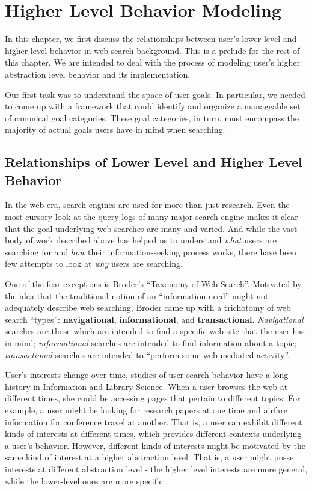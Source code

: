 \chapter{Higher Level Behavior Modeling}

In this chapter, we first discuss the relationships between user's lower level and higher level behavior in web search background. This is a prelude for the rest of this chapter. We are intended to deal with the process of modeling user's higher abstraction level behavior and its implementation. 

Our first task was to understand the space of user goals. In particular, we needed to come up with a framework that could identify and organize a manageable set of canonical goal categories. These goal categories, in turn, must encompass the majority of actual goals users have in mind when searching.

\section{Relationships of Lower Level and Higher Level Behavior}

In the web era, search engines are used for more than just research. Even the most cursory look at the query logs of many major search engine makes it clear that the goal underlying web searches are many and varied. And while the vast body of work described above has helped us to understand {\it what} users are searching for and {\it how} their information-seeking process works, there have been few attempts to look at {\it why} users are searching.

One of the fear exceptions is Broder's ``Taxonomy of Web Search''\cite{Broder2002}. Motivated by the idea that the traditional notion of an ``information need'' might not adequately describe web searching, Broder came up with a trichotomy of web search ``types'': {\bf navigational}, {\bf informational}, and {\bf transactional}. {\it Navigational} searches are those which are intended to find a specific web site that the user has in mind; {\it informational} searches are intended to find information about a topic; {\it transactional} searches are intended to ``perform some web-mediated activity''.

User's interests change over time, studies of user search behavior have a long history in Information and Library Science\cite{Bates1979}\cite{Rose}\cite{Spink2002}. When a user browses the web at different times, she could be accessing pages that pertain to different topics. For example, a user might be looking for research papers at one time and airfare information for conference travel at another. That is, a user can exhibit different kinds of interests at different times, which provides different contexts underlying a user's behavior. However, different kinds of interests might be motivated by the same kind of interest at a higher abstraction level. That is, a user might posse interests at different abstraction level - the higher level interests are more general, while the lower-level ones are more specific.

